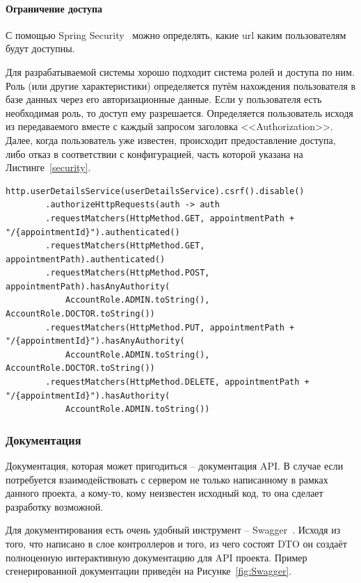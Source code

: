 \documentclass[a4paper,article]{article}
\begin{document}
\begin{sloppypar}
    \paragraph{Ограничение доступа}

    С помощью Spring Security~\cite{springguide} можно определять, какие url каким пользователям будут доступны.

    Для разрабатываемой системы хорошо подходит система ролей и доступа по ним. Роль (или другие характеристики) определяется путём нахождения пользователя в базе данных через его авторизационные данные. Если у пользователя есть необходимая роль, то доступ ему разрешается. Определяется пользователь исходя из передаваемого вместе с каждый запросом заголовка <<Authorization>>. Далее, когда пользователь уже известен, происходит предоставление доступа, либо отказ в соответствии с конфигурацией, часть которой указана на Листинге~\ref{security}.

    \newpage

    \begin{lstlisting}[label=security,caption=Пример кода для разграничения доступа]
    http.userDetailsService(userDetailsService).csrf().disable()
        .authorizeHttpRequests(auth -> auth
        .requestMatchers(HttpMethod.GET, appointmentPath + "/{appointmentId}").authenticated()
        .requestMatchers(HttpMethod.GET, appointmentPath).authenticated()
        .requestMatchers(HttpMethod.POST, appointmentPath).hasAnyAuthority(
            AccountRole.ADMIN.toString(), AccountRole.DOCTOR.toString())
        .requestMatchers(HttpMethod.PUT, appointmentPath + "/{appointmentId}").hasAnyAuthority(
            AccountRole.ADMIN.toString(), AccountRole.DOCTOR.toString())
        .requestMatchers(HttpMethod.DELETE, appointmentPath + "/{appointmentId}").hasAuthority(
            AccountRole.ADMIN.toString())
    \end{lstlisting}

    \subsubsection{Документация}\label{Реализация. Сервер. Документация}

    Документация, которая может пригодиться -- документация API. В случае если потребуется взаимодействовать с сервером не только написанному в рамках данного проекта, а кому-то, кому неизвестен исходный код, то она сделает разработку возможной.

    Для документирования есть очень удобный инструмент -- Swagger~\cite{springguide}. Исходя из того, что написано в слое контроллеров и того, из чего состоят DTO он создаёт полноценную интерактивную документацию для API проекта. Пример сгенерированной документации приведён на Рисунке~\ref{fig:Swagger}.


\end{sloppypar}
\end{document}
